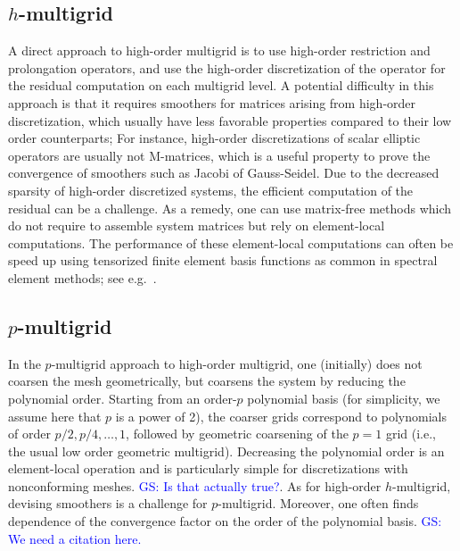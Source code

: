 \documentclass[smallcondensed,final]{svjour3}     %
\newcommand{\gsnote}[1]{\textcolor{blue}{GS: #1}}
\begin{document}
\subsection{$h$-multigrid}\label{subsec:h}
A direct approach to high-order multigrid is to use high-order
restriction and prolongation operators, and use the high-order
discretization of the operator for the residual computation on each
multigrid level.  A potential difficulty in this approach is that it
requires smoothers for matrices arising from high-order
discretization, which usually have less favorable properties compared
to their low order counterparts; For instance, high-order
discretizations of scalar elliptic operators are usually not
M-matrices, which is a useful property to prove the convergence of
smoothers such as Jacobi of Gauss-Seidel.  Due to the decreased
sparsity of high-order discretized systems, the efficient computation
of the residual can be a challenge. As a remedy, one can use
matrix-free methods which do not require to assemble system matrices
but rely on element-local computations. The performance of these
element-local computations can often be speed up using tensorized
finite element basis functions as common in spectral element methods;
see e.g.~\cite{DevilleFischerMund02}.


\subsection{$p$-multigrid}\label{subsec:p}
In the $p$-multigrid approach to high-order multigrid, one (initially)
does not coarsen the mesh geometrically, but coarsens the system by
reducing the polynomial order. Starting from an order-$p$ polynomial
basis (for simplicity, we assume here that $p$ is a power of 2), the
coarser grids correspond to polynomials of order $p/2, p/4,\ldots,1$,
followed by geometric coarsening of the $p=1$ grid (i.e., the usual
low order geometric multigrid). Decreasing the polynomial order is an
element-local operation and is particularly simple for discretizations
with nonconforming meshes. \gsnote{Is that actually true?}. As for
high-order $h$-multigrid, devising smoothers is a challenge for
$p$-multigrid.  Moreover, one often finds dependence of the
convergence factor on the order of the polynomial basis. \gsnote{We
  need a citation here.}
\end{document}
